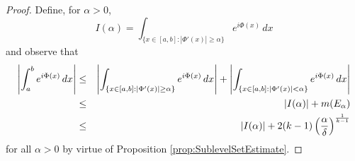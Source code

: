 \documentclass[11pt, letter]{book}
\newcommand{\lp}{\left(}
\newcommand{\rp}{\right)}
\newcommand{\f}[2]{\frac{#1}{#2}}
\newcommand{\al}{\alpha}
\begin{document}
\begin{proof}
Define, for $\alpha>0$,
\begin{equation*}
    I(\alpha)=\int_{\{x\in[a,b]:|\Phi'(x)|\geq \alpha\}}e^{i\Phi(x)}\,dx
\end{equation*}
and observe that
\begin{eqnarray*}
    \abs{\int_a^b e^{i \Phi(x)} \,dx}
    &\leq&  \abs{\int_{\{x\in[a,b]:|\Phi'(x)|\geq \alpha\}}e^{i\Phi(x)}\,dx}
    + 
    \abs{\int_{\{ x\in [a,b]: \abs{\Phi'(x)} < \al \}}e^{i \Phi(x)} \,dx } \\
    &\leq& \abs{I(\alpha)}  + m(E_\al)\\
    &\leq& \abs{I(\alpha)} + 2(k-1)\lp\f{\al}{\delta}\rp^{\f{1}{k-1}}
\end{eqnarray*}
for all $\alpha>0$ by virtue of Proposition \ref{prop:SublevelSetEstimate}. 


\end{proof}
\end{document}
